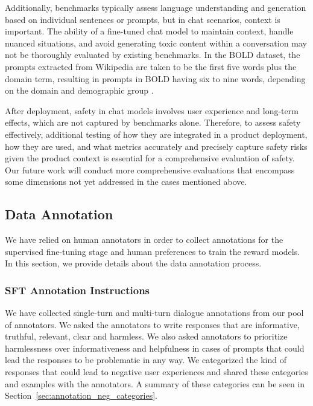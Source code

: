 Additionally, benchmarks typically assess language understanding and generation based on individual sentences or prompts, but in chat scenarios, context is important. The ability of a fine-tuned chat model to maintain context, handle nuanced situations, and avoid generating toxic content within a conversation may not be thoroughly evaluated by existing benchmarks. 
In the BOLD dataset, the prompts extracted from Wikipedia are taken to be the first five words plus the domain term, resulting in prompts in BOLD having six to nine words, depending on the domain and demographic group \citep{dhamala2021bold}. 

After deployment, safety in chat models involves user experience and long-term effects, which are not captured by benchmarks alone. Therefore, to assess safety effectively, additional testing of how they are integrated in a product deployment, how they are used, and what metrics accurately and precisely capture safety risks given the product context is essential for a comprehensive evaluation of safety. Our future work will conduct more comprehensive evaluations that encompass some dimensions not yet addressed in the cases mentioned above. 

\subsection{Data Annotation}
\label{sec:data_annotation}

We have relied on human annotators in order to collect annotations for the supervised fine-tuning stage and human preferences to train the reward models. In this section, we provide details about the data annotation process.

\subsubsection{SFT Annotation Instructions}

We have collected single-turn and multi-turn dialogue annotations from our pool of annotators. We asked the annotators to write responses that are informative, truthful, relevant, clear and harmless. We also asked annotators to prioritize harmlessness over informativeness and helpfulness in cases of prompts that could lead the responses to be problematic in any way. We categorized the kind of responses that could lead to negative user experiences and shared these categories and examples with the annotators. A summary of these categories can be seen in Section~\ref{sec:annotation_neg_categories}.

